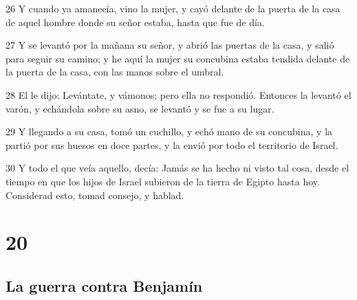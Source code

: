 \par 26 Y cuando ya amanecía, vino la mujer, y cayó delante de la puerta de la casa de aquel hombre donde su señor estaba, hasta que fue de día.
\par 27 Y se levantó por la mañana su señor, y abrió las puertas de la casa, y salió para seguir su camino; y he aquí la mujer su concubina estaba tendida delante de la puerta de la casa, con las manos sobre el umbral.
\par 28 El le dijo: Levántate, y vámonos; pero ella no respondió. Entonces la levantó el varón, y echándola sobre su asno, se levantó y se fue a su lugar.
\par 29 Y llegando a su casa, tomó un cuchillo, y echó mano de su concubina, y la partió por sus huesos en doce partes, y la envió por todo el territorio de Israel.
\par 30 Y todo el que veía aquello, decía: Jamás se ha hecho ni visto tal cosa, desde el tiempo en que los hijos de Israel subieron de la tierra de Egipto hasta hoy. Considerad esto, tomad consejo, y hablad.

\chapter{20}

\section*{La guerra contra Benjamín}

